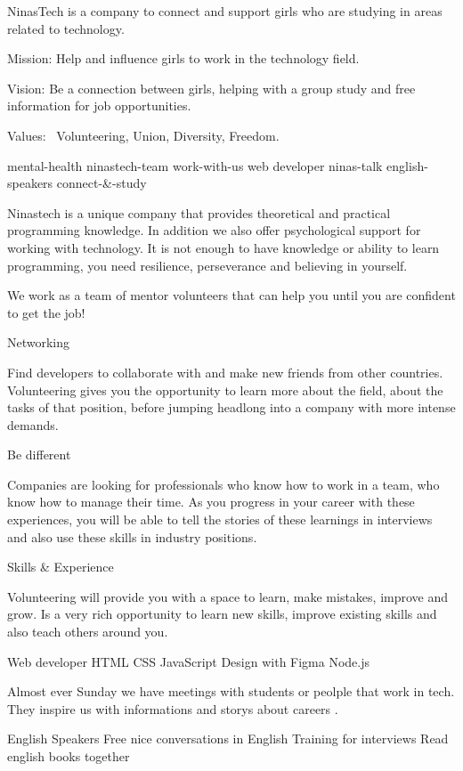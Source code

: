 NinasTech is a company to connect and support  girls 
who are studying in areas related to technology.

Mission: Help and influence girls to work in the technology field.

Vision: Be a connection between  girls, helping with a group study and free information for job opportunities.

Values:  Volunteering, Union, Diversity, Freedom.

mental-health
ninastech-team
work-with-us
web developer
ninas-talk
english-speakers
connect-&-study

Ninastech is a unique company that provides theoretical and practical programming knowledge. 
In addition  we also offer psychological support for working with technology.
It is not enough to have knowledge or ability to learn programming, you need resilience, perseverance and believing in yourself.


We work as a team of mentor volunteers that can help you until you are confident to get the job!


Networking
 
Find developers to collaborate with and make new friends from other countries. 
Volunteering  gives you the opportunity to learn more about the field, about the tasks of that position, before jumping headlong into a company with more intense demands.

Be different

Companies are looking for professionals who know how to work in a team,  who know how to manage their time. As you progress in your career with these experiences, you will be able to tell the stories of these learnings in interviews and also use these skills in industry positions. 

Skills & Experience 

Volunteering will provide you with a space to learn, make mistakes, improve and grow. Is a very rich opportunity  to learn new skills, improve existing skills and also teach others around you.  

Web developer 
HTML
CSS
JavaScript
Design with Figma
Node.js 


Almost ever Sunday we have meetings with students or peolple that work in tech. They inspire us with informations and storys about careers .

English Speakers
Free nice conversations in English
Training for interviews
Read english books together  
